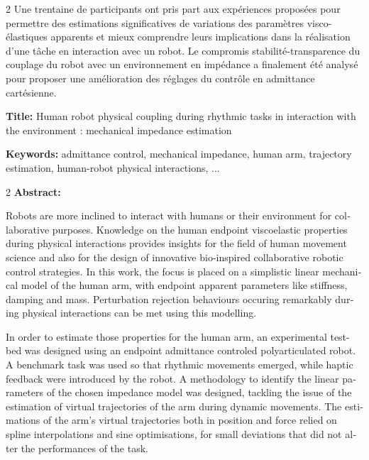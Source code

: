 \documentclass[french,12pt,a4paper]{book}
\begin{document}
\begin{mdframed}[linecolor=Prune,linewidth=1]
\begin{multicols}{2}
Une trentaine de participants ont pris part aux expériences proposées pour permettre des estimations significatives de variations des paramètres visco-élastiques apparents et mieux comprendre leurs implications dans la réalisation d'une tâche en interaction avec un robot. 
Le compromis stabilité-transparence du couplage du robot avec un environnement en impédance a finalement été analysé pour proposer une amélioration des réglages du contrôle en admittance cartésienne.

\end{multicols}

\end{mdframed}

\vspace{.25cm}

\begin{mdframed}[linecolor=Prune,linewidth=1]
\begin{english}
\textbf{Title:} Human robot physical coupling during rhythmic tasks in interaction with the environment : mechanical impedance estimation

\vspace{.25cm}
\noindent \textbf{Keywords:} admittance control, mechanical impedance, human arm, trajectory estimation, human-robot physical interactions, ...

\vspace{-.5cm}
\begin{multicols}{2}
\noindent \textbf{Abstract:}

Robots are more inclined to interact with humans or their environment for collaborative purposes.
Knowledge on the human endpoint viscoelastic properties during physical interactions provides insights for the field of human movement science and also for the design of innovative bio-inspired collaborative robotic control strategies.
In this work, the focus is placed on a simplistic linear mechanical model of the human arm, with endpoint apparent parameters like stiffness, damping and mass.
Perturbation rejection behaviours occuring remarkably during physical interactions can be met using this modelling.

In order to estimate those properties for the human arm, an experimental test-bed was designed using an endpoint admittance controled polyarticulated robot.
A benchmark task was used so that rhythmic movements emerged, while haptic feedback were introduced by the robot.
A methodology to identify the linear parameters of the chosen impedance model was designed, tackling the issue of the estimation of virtual trajectories of the arm during dynamic movements. 
The estimations of the arm's virtual trajectories both in position and force relied on spline interpolations and sine optimisations, for small deviations that did not alter the performances of the task.


\end{multicols}
\end{english}
\end{mdframed}
\end{document}
